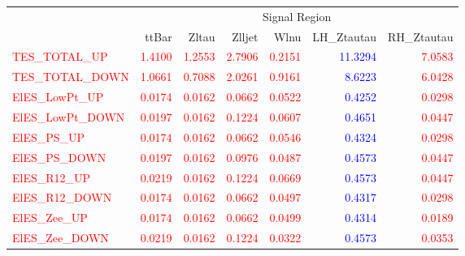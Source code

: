 \documentclass[11pt,oneside,a4paper]{article}
\begin{document}
\centering
\begin{table}
\centering
\begin{tabular}{lrrrrrr}
 & \multicolumn{6}{c}{Signal Region} \\
 & ttBar & Zltau & Zlljet & Wlnu & LH\_Ztautau & RH\_Ztautau \\
\textcolor{red}{TES\_TOTAL\_UP} & \textcolor{red}{1.4100} & \textcolor{red}{1.2553} & \textcolor{red}{2.7906} & \textcolor{red}{0.2151} & \textcolor{blue}{11.3294} & \textcolor{red}{7.0583} \\
\textcolor{red}{TES\_TOTAL\_DOWN} & \textcolor{red}{1.0661} & \textcolor{red}{0.7088} & \textcolor{red}{2.0261} & \textcolor{red}{0.9161} & \textcolor{blue}{8.6223} & \textcolor{red}{6.0428} \\
\textcolor{red}{ElES\_LowPt\_UP} & \textcolor{red}{0.0174} & \textcolor{red}{0.0162} & \textcolor{red}{0.0662} & \textcolor{red}{0.0522} & \textcolor{blue}{0.4252} & \textcolor{red}{0.0298} \\
\textcolor{red}{ElES\_LowPt\_DOWN} & \textcolor{red}{0.0197} & \textcolor{red}{0.0162} & \textcolor{red}{0.1224} & \textcolor{red}{0.0607} & \textcolor{blue}{0.4651} & \textcolor{red}{0.0447} \\
\textcolor{red}{ElES\_PS\_UP} & \textcolor{red}{0.0174} & \textcolor{red}{0.0162} & \textcolor{red}{0.0662} & \textcolor{red}{0.0546} & \textcolor{blue}{0.4324} & \textcolor{red}{0.0298} \\
\textcolor{red}{ElES\_PS\_DOWN} & \textcolor{red}{0.0197} & \textcolor{red}{0.0162} & \textcolor{red}{0.0976} & \textcolor{red}{0.0487} & \textcolor{blue}{0.4573} & \textcolor{red}{0.0447} \\
\textcolor{red}{ElES\_R12\_UP} & \textcolor{red}{0.0219} & \textcolor{red}{0.0162} & \textcolor{red}{0.1224} & \textcolor{red}{0.0669} & \textcolor{blue}{0.4573} & \textcolor{red}{0.0447} \\
\textcolor{red}{ElES\_R12\_DOWN} & \textcolor{red}{0.0174} & \textcolor{red}{0.0162} & \textcolor{red}{0.0662} & \textcolor{red}{0.0497} & \textcolor{blue}{0.4317} & \textcolor{red}{0.0298} \\
\textcolor{red}{ElES\_Zee\_UP} & \textcolor{red}{0.0174} & \textcolor{red}{0.0162} & \textcolor{red}{0.0662} & \textcolor{red}{0.0499} & \textcolor{blue}{0.4314} & \textcolor{red}{0.0189} \\
\textcolor{red}{ElES\_Zee\_DOWN} & \textcolor{red}{0.0219} & \textcolor{red}{0.0162} & \textcolor{red}{0.1224} & \textcolor{red}{0.0322} & \textcolor{blue}{0.4573} & \textcolor{red}{0.0353} \\

\end{tabular}
\end{table}
\end{document}
